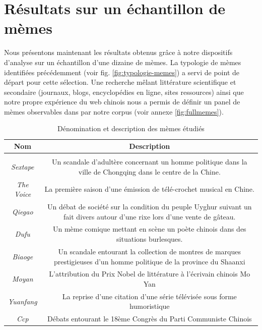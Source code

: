 \section{Résultats sur un échantillon de mèmes}
\label{sec:results-memes}

Nous présentons maintenant les résultats obtenus grâce à notre dispositifs d'analyse sur un échantillon d'une dizaine de mèmes. La typologie de mèmes identifiées précédemment (voir fig. \ref{fig:typologie-memes}) a servi de point de départ pour cette sélection. Une recherche mêlant littérature scientifique et secondaire (journaux, blogs, encyclopédies en ligne, sites ressources) ainsi que notre propre expérience du web chinois nous a permis de définir un panel de mèmes observables dans par notre corpus (voir annexe \ref{fig:fullmemes}). 

\begin{table}[h!]
  \begin{tabulary}{\textwidth}{c|C}

    \textbf{Nom} &
    \textbf{Description}\\
    \hline \\[-1.5ex]
    \textit{Sextape} &
    Un scandale d{\textquoteright}adultère concernant un homme politique
    dans la ville de Chongqing dans le centre de la Chine.\\[2ex]

    \textit{The Voice} &
    La première saison d{\textquoteright}une émission de
    télé-crochet musical en Chine.\\[2ex]

    \textit{Qiegao} &
    Un débat de société sur la condition du peuple Uyghur suivant un
    fait divers autour d{\textquoteright}une rixe lors
    d{\textquoteright}une vente de gâteau.\\[2ex]

    \textit{Dufu} &
    Un mème comique mettant en scène un poète chinois dans des
    situations burlesques.\\[2ex]

    \textit{Biaoge} &
    Un scandale entourant la collection de montres de marques prestigieuses
    d{\textquoteright}un homme politique de la province du Shaanxi \\[2ex]

    \textit{Moyan} &
    L{\textquoteright}attribution du Prix Nobel de littérature \`a
    l{\textquoteright}écrivain chinois Mo Yan\\[2ex]

    \textit{Yuanfang} &
    La reprise d{\textquoteright}une citation d{\textquoteright}une série
    télévisée sous forme humoristique\\[2ex]

    \textit{Ccp} &
    Débats entourant le 18ème Congrès du Parti Communiste Chinois\\[2ex]

  \end{tabulary}
  \caption{Dénomination et description des mèmes étudiés}
  \label{fig:meme-sample}
\end{table}

